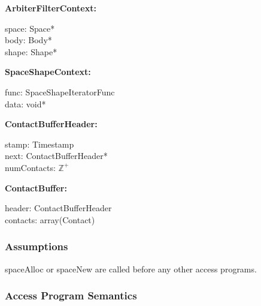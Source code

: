 \documentclass[12pt]{article}
\newcommand{\UZ}{$\mathbb{Z}^+$}
\begin{document}
	\noindent \textbf{ArbiterFilterContext:}
	\begin{multicols}{3}
		\noindent space: Space* \\
		body: Body* \\
		shape: Shape* 
	\end{multicols}
	
	\noindent \textbf{SpaceShapeContext:}
	\begin{multicols}{2}
		\noindent func: SpaceShapeIteratorFunc \\
		data: void*
	\end{multicols}
	
	\noindent \textbf{ContactBufferHeader:}
	\begin{multicols}{3}
		\noindent stamp: Timestamp \\
		next: ContactBufferHeader* \\
		numContacts: \UZ
	\end{multicols}
	
	\noindent \textbf{ContactBuffer:}
	\begin{multicols}{2}
		\noindent header: ContactBufferHeader \\
		contacts: array(Contact) 
	\end{multicols}
	


\subsubsection{Assumptions} \label{SecASpace}
	spaceAlloc or spaceNew are called before any other access programs.

\subsubsection{Access Program Semantics}  \label{SecAPSSpace}
\end{document}
